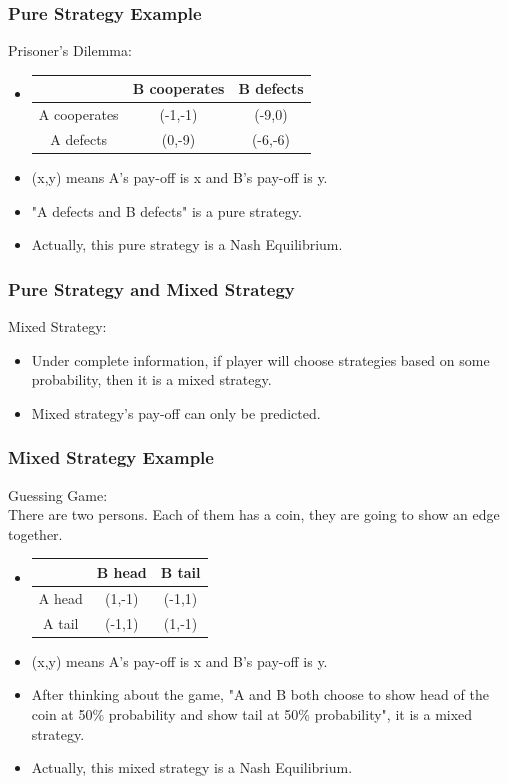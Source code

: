 \documentclass{beamer}
\begin{document}
\begin{frame}
\frametitle{Pure Strategy Example}
Prisoner's Dilemma:
\begin{itemize}
\item
\begin{tabular}{|c|c|c|}
\hline
\hline
    & B cooperates & B defects\\
\hline
A cooperates & (-1,-1) & (-9,0)\\
\hline
A defects & (0,-9) & (-6,-6)\\
\hline
\hline
\end{tabular}
\item
(x,y) means A's pay-off is x and B's pay-off is y.\\
\item {\color{red} "A defects and B defects"} is a pure strategy.\\
\item Actually, this pure strategy is a {\color{red}Nash Equilibrium}.
\end{itemize}
\end{frame}

\begin{frame}
\frametitle{Pure Strategy and Mixed Strategy}
Mixed Strategy:\\
\begin{itemize}
\item Under complete information, if player will choose strategies based {\color{red}on some probability}, then it is a mixed strategy.
\item Mixed strategy's pay-off can only be {\color{red} predicted}.
\end{itemize}
\end{frame}

\begin{frame}
\frametitle{Mixed Strategy Example}
Guessing Game:\\
There are two persons. Each of them has a coin, they are going to show an edge together.\\
\begin{itemize}
\item
\begin{tabular}{|c|c|c|}
\hline
\hline
    & B head & B tail\\
\hline
A head & (1,-1) & (-1,1)\\
\hline
A tail & (-1,1) & (1,-1)\\
\hline
\hline
\end{tabular}
\item
(x,y) means A's pay-off is x and B's pay-off is y.\\
\item After thinking about the game, {\color{red}"A and B both choose to show head of the coin at 50\% probability and show tail at 50\% probability"}, it is a mixed strategy.
\item Actually, this mixed strategy is a {\color{red}Nash Equilibrium}.
\end{itemize}
\end{frame}
\end{document}

